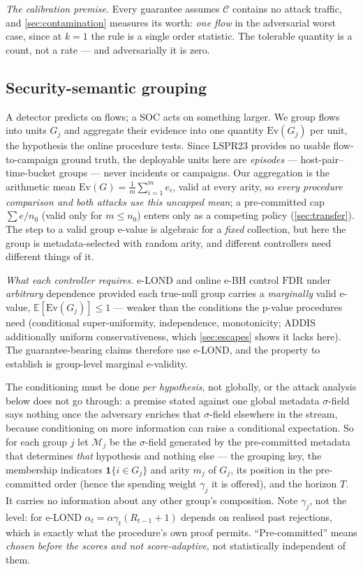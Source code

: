 \documentclass[conference]{IEEEtran}
\newcommand{\Cal}{\mathcal{C}}
\newcommand{\alphat}{\alpha_t}
\newcommand{\Ev}{\mathrm{Ev}}
\newcommand{\FDR}{\mathrm{FDR}}
\begin{document}
\emph{The calibration premise.} Every guarantee assumes $\Cal$ contains no attack traffic, and
\cref{sec:contamination} measures its worth: \emph{one flow} in the adversarial worst case, since at
$k=1$ the rule is a single order statistic. The tolerable quantity is a count, not a rate --- and
adversarially it is zero.

\subsection{Security-semantic grouping}

A detector predicts on flows; a SOC acts on something larger. We group flows into units $G_j$ and
aggregate their evidence into one quantity $\Ev(G_j)$ per unit, the hypothesis the online procedure
tests. Since LSPR23 provides no usable flow-to-campaign ground truth, the deployable units here are
\emph{episodes} --- host-pair--time-bucket groups --- never incidents or campaigns. Our aggregation is
the arithmetic mean $\Ev(G) = \frac{1}{m}\sum_{i=1}^{m} e_i$, valid at every arity, so \emph{every
procedure comparison and both attacks use this uncapped mean}; a pre-committed cap $\sum e/n_0$ (valid
only for $m \le n_0$) enters only as a competing policy (\cref{sec:transfer}).
The step to a valid group e-value is algebraic for a \emph{fixed} collection, but here the group is
metadata-selected with random arity, and different controllers need different things of it.

\emph{What each controller requires.} e-LOND and online e-BH control $\FDR$ under \emph{arbitrary}
dependence provided each true-null group carries a \emph{marginally} valid e-value,
$\mathbb{E}[\Ev(G_j)]\le1$ --- weaker than the conditions the p-value procedures need (conditional
super-uniformity, independence, monotonicity; ADDIS additionally uniform conservativeness, which
\cref{sec:escapes} shows it lacks here). The guarantee-bearing claims therefore use e-LOND, and the
property to establish is group-level marginal e-validity.

The conditioning must be done \emph{per hypothesis}, not globally, or the attack analysis below does
not go through: a premise stated against one global metadata $\sigma$-field says nothing once the
adversary enriches that $\sigma$-field elsewhere in the stream, because conditioning on more
information can raise a conditional expectation. So for each group $j$ let $\mathcal{M}_j$ be the
$\sigma$-field generated by the pre-committed metadata that determines \emph{that} hypothesis and
nothing else --- the grouping key, the membership indicators $\mathbf 1\{i\in G_j\}$ and arity $m_j$
of $G_j$, its position in the pre-committed order (hence the spending weight $\gamma_j$ it is
offered), and the horizon $T$. It carries no information about any other group's composition. Note
$\gamma_j$, not the level: for e-LOND $\alphat=\alpha\gamma_t(R_{t-1}+1)$ depends on realised past
rejections, which is exactly what the procedure's own proof permits. ``Pre-committed'' means
\emph{chosen before the scores and not score-adaptive}, not statistically independent of them.
\end{document}
